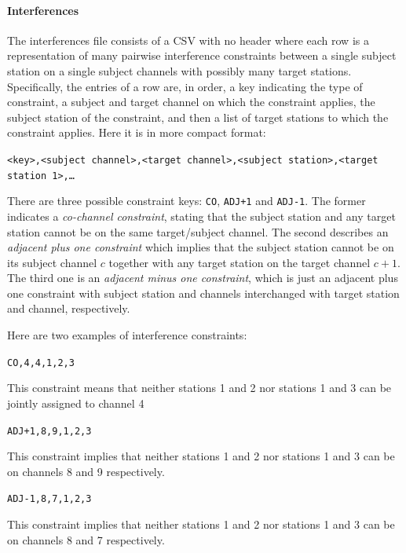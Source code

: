 \documentclass[
10pt, %
letterpaper, %
oneside, %
headinclude,footinclude, %
BCOR5mm, %
needspace, %
]{scrartcl}
\begin{document}
\paragraph{Interferences} The interferences file consists of a CSV with no header where each row is a representation of many pairwise interference constraints between a single subject station on a single subject channels with possibly many target stations. Specifically, the entries of a row are, in order, a key indicating the type of constraint, a subject and target channel on which the constraint applies, the subject station of the constraint, and then a list of target stations to which the constraint applies. Here it is in more compact format:
\begin{center}
\texttt{<key>,<subject channel>,<target channel>,<subject station>,<target station 1>,\ldots}
\end{center}
There are three possible constraint keys: \texttt{CO}, \texttt{ADJ+1} and \texttt{ADJ-1}. The former indicates a \emph{co-channel constraint}, stating that the subject station and any target station cannot be on the same target/subject channel. The second describes an \emph{adjacent plus one constraint} which implies that the subject station cannot be on its subject channel $c$ together with any target station on the target channel $c+1$. The third one is an \emph{adjacent minus one constraint}, which is just an adjacent plus one constraint with subject station and channels interchanged with target station and channel, respectively.

Here are two examples of interference constraints:
\begin{center}
\texttt{CO,4,4,1,2,3}
\end{center}
This constraint means that neither stations 1 and 2 nor stations 1 and 3 can be jointly assigned to channel 4
\begin{center}
\texttt{ADJ+1,8,9,1,2,3}
\end{center}
This constraint implies that neither stations 1 and 2 nor stations 1 and 3 can be on channels 8 and 9 respectively.
\begin{center}
\texttt{ADJ-1,8,7,1,2,3}
\end{center}
This constraint implies that neither stations 1 and 2 nor stations 1 and 3 can be on channels 8 and 7 respectively.
\end{document}
